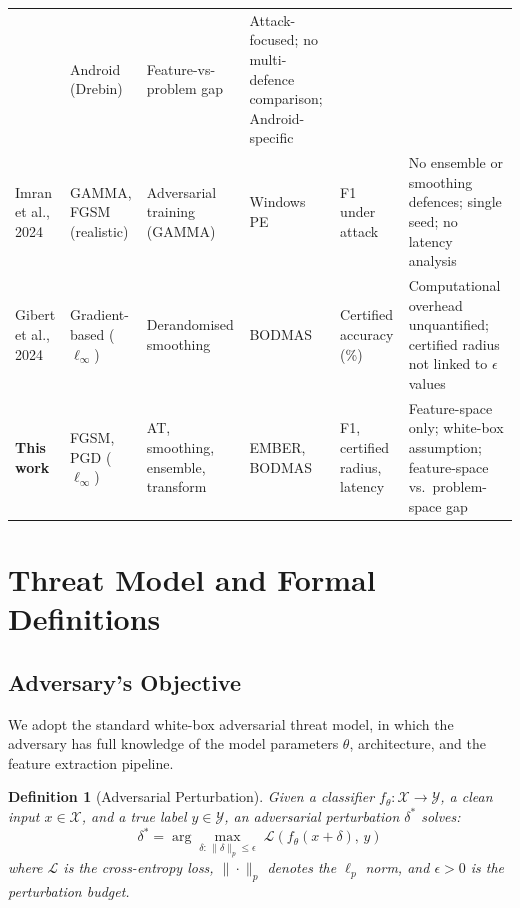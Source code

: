 \documentclass[conference]{IEEEtran}
\newtheorem{definition}{Definition}
\begin{document}
\begin{table}[!ht]
\begin{tabular}{p{2.6cm}p{2.1cm}p{2.5cm}p{2.2cm}p{2.1cm}p{3.8cm}}
  & Android (Drebin)
  & Feature-vs-problem gap
  & Attack-focused; no multi-defence comparison; Android-specific \\
\addlinespace
Imran et al., 2024 \cite{imran2024}
  & GAMMA, FGSM (realistic)
  & Adversarial training (GAMMA)
  & Windows PE
  & F1 under attack
  & No ensemble or smoothing defences; single seed; no latency analysis \\
\addlinespace
Gibert et al., 2024 \cite{gibert2024}
  & Gradient-based ($\ell_\infty$)
  & Derandomised smoothing
  & BODMAS
  & Certified accuracy (\%)
  & Computational overhead unquantified; certified radius not linked to $\epsilon$ values \\
\addlinespace
\textbf{This work}
  & FGSM, PGD ($\ell_\infty$)
  & AT, smoothing, ensemble, transform
  & EMBER, BODMAS
  & F1, certified radius, latency
  & Feature-space only; white-box assumption; feature-space vs.\ problem-space gap \\
\bottomrule
\end{tabular}
\end{table}

\section{Threat Model and Formal Definitions}
\label{sec:threatmodel}

\subsection{Adversary's Objective}

We adopt the standard white-box adversarial threat model, in which the adversary has full knowledge of the model parameters $\theta$, architecture, and the feature extraction pipeline.

\begin{definition}[Adversarial Perturbation]
Given a classifier $f_\theta : \mathcal{X} \to \mathcal{Y}$, a clean input $x \in \mathcal{X}$, and a true label $y \in \mathcal{Y}$, an adversarial perturbation $\delta^*$ solves:
\begin{equation}
\delta^* = \arg\max_{\delta:\,\|\delta\|_p \leq \epsilon}\; \mathcal{L}(f_\theta(x + \delta),\, y)
\label{eq:adv_objective}
\end{equation}
where $\mathcal{L}$ is the cross-entropy loss, $\|\cdot\|_p$ denotes the $\ell_p$ norm, and $\epsilon > 0$ is the perturbation budget.
\end{definition}
\end{document}
